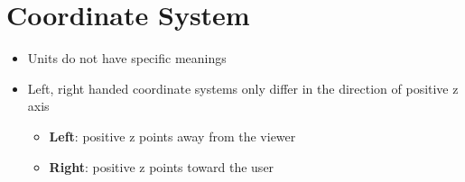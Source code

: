 \section{Coordinate System}

\begin{itemize}
  \item Units do not have specific meanings
  \item Left, right handed coordinate systems only differ in the direction of
  positive z axis
  \begin{itemize}
    \item \textbf{Left}: positive z points away from the viewer
    \item \textbf{Right}: positive z points toward the user
  \end{itemize}
\end{itemize}
